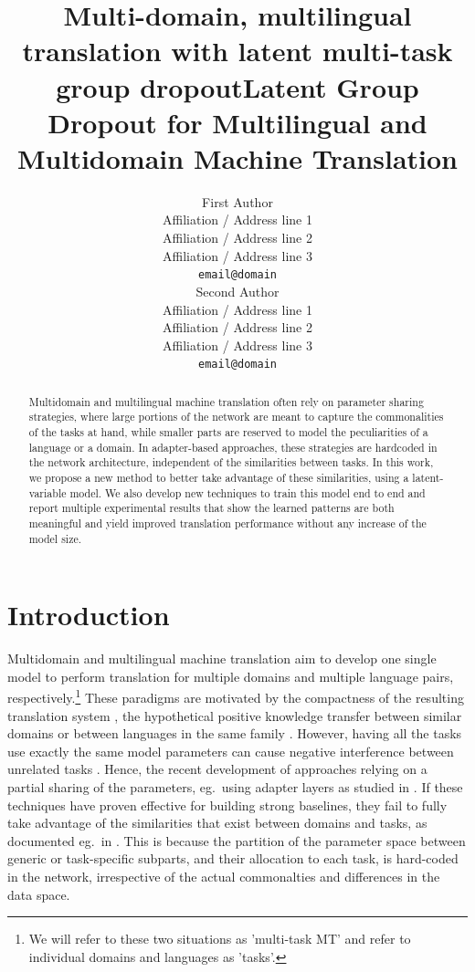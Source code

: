 \documentclass[11pt]{article}
\title{Multi-domain, multilingual translation with latent multi-task group dropout}
\title{Latent Group Dropout for Multilingual and Multidomain Machine Translation}
\author{First Author \\
  Affiliation / Address line 1 \\
  Affiliation / Address line 2 \\
  Affiliation / Address line 3 \\
  \texttt{email@domain} \\\And
  Second Author \\
  Affiliation / Address line 1 \\
  Affiliation / Address line 2 \\
  Affiliation / Address line 3 \\
  \texttt{email@domain} \\}
\begin{document}
\setlength{\abovedisplayskip}{3pt}
\setlength{\belowdisplayskip}{3pt}
\maketitle

\begin{abstract}
  Multidomain and multilingual machine translation often rely on parameter sharing strategies, where large portions of the network are meant to capture the commonalities of the tasks at hand, while smaller parts are reserved to model the peculiarities of a language or a domain. In adapter-based approaches, these strategies are hardcoded in the network architecture, independent of the similarities between tasks. In this work, we propose a new method to better take advantage of these similarities, using a latent-variable model. We also develop new techniques to train this model end to end and report multiple experimental results that show the learned patterns are both meaningful and yield improved translation performance without any increase of the model size. 
\end{abstract}

\section{Introduction}
Multidomain and multilingual machine translation aim to develop one single model to perform translation for multiple domains and multiple language pairs, respectively.\footnote{We will refer to these two situations as 'multi-task MT' and refer to individual domains and languages as 'tasks'.} These paradigms are motivated by the compactness of the resulting translation system \citep{Chu18multilingual,dabre20survey}, the hypothetical positive knowledge transfer between similar domains \citep{Pham21revisiting} or between languages in the same family \citep{Tan19multilingual}. However, having all the tasks use exactly the same model parameters can cause negative interference between unrelated tasks \citep{conneau20unsupervised,wang20negative}. Hence, the recent development of approaches relying on a partial sharing of the parameters, eg.\ using adapter layers as studied in \citep{houlsby19parameter,Bapna19simple,Pham20Study,Philip20monolingual}. If these techniques have proven effective for building strong baselines, they fail to fully take advantage of the similarities that exist between domains and tasks, as documented eg.\ in \citep{Pham21revisiting}. This is because the partition of the parameter space between generic or task-specific subparts, and their allocation to each task, is hard-coded in the network, irrespective of the actual commonalties and differences in the data space.
\end{document}
